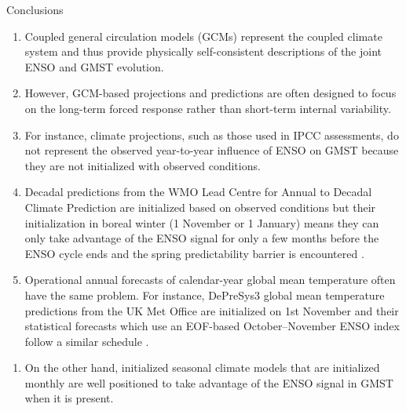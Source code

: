 \documentclass[aspectratio=169,xcolor=dvipsnames]{beamer}
\begin{document}
\begin{frame}[allowframebreaks]{Conclusions}
\begin{enumerate}
\end{enumerate}


\begin{enumerate}\fontsize{6pt}{8pt}\selectfont


\item Coupled general circulation models (GCMs) represent the coupled
  climate system and thus provide physically self-consistent
  descriptions of the joint ENSO and GMST evolution.

\item However, GCM-based projections and predictions are often
  designed to focus on the long-term forced response rather than
  short-term internal variability.

\item For instance, climate projections, such as those used in IPCC
  assessments, do not represent the observed year-to-year influence of
  ENSO on GMST because they are not initialized with observed
  conditions.

\item Decadal predictions from the WMO Lead Centre for Annual to
  Decadal Climate Prediction are initialized based on observed
  conditions but their initialization in boreal winter (1 November or
  1 January) means they can only take advantage of the ENSO signal for
  only a few months before the ENSO cycle ends and the spring
  predictability barrier is encountered
  \citep{Hermanson2022wmo,WMO2025GADCU}.

  
\item Operational annual forecasts of calendar-year global mean
  temperature often have the same problem. For instance, DePreSys3
  global mean temperature predictions from the UK Met Office are
  initialized on 1st November \citep{Dunstone2024will} and their
  statistical forecasts which use an EOF-based October–November ENSO
  index follow a similar schedule \citep{Folland2025review}.

\end{enumerate}

\begin{enumerate}\fontsize{6pt}{8pt}\selectfont
  
\item On the other hand, initialized seasonal climate models that are
  initialized monthly are well positioned to take advantage of the
  ENSO signal in GMST when it is present.



\end{enumerate}
\end{frame}
\end{document}

